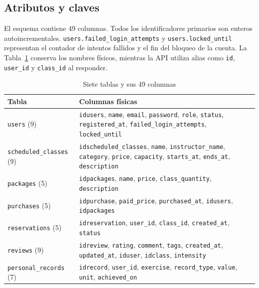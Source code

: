 \subsection{Atributos y claves}
El esquema contiene 49 columnas. Todos los identificadores primarios son enteros autoincrementales. \texttt{users.failed\_login\_attempts} y \texttt{users.locked\_until} representan el contador de intentos fallidos y el fin del bloqueo de la cuenta. La Tabla~\ref{tab:atributos-laura} conserva los nombres físicos, mientras la API utiliza alias como \texttt{id}, \texttt{user\_id} y \texttt{class\_id} al responder.
\begin{table}[!t]\caption{Siete tablas y sus 49 columnas}\label{tab:atributos-laura}\centering\footnotesize
\begin{tabular}{p{}p{}}\toprule
Tabla & Columnas físicas \\ \midrule
\texttt{users} (9) & \texttt{idusers}, \texttt{name}, \texttt{email}, \texttt{password}, \texttt{role}, \texttt{status}, \texttt{registered\_\allowbreak{}at}, \texttt{failed\_\allowbreak{}login\_\allowbreak{}attempts}, \texttt{locked\_\allowbreak{}until} \\
\texttt{scheduled\_\allowbreak{}classes} (9) & \texttt{idscheduled\_\allowbreak{}classes}, \texttt{name}, \texttt{instructor\_\allowbreak{}name}, \texttt{category}, \texttt{price}, \texttt{capacity}, \texttt{starts\_\allowbreak{}at}, \texttt{ends\_\allowbreak{}at}, \texttt{description} \\
\texttt{packages} (5) & \texttt{idpackages}, \texttt{name}, \texttt{price}, \texttt{class\_\allowbreak{}quantity}, \texttt{description} \\
\texttt{purchases} (5) & \texttt{idpurchase}, \texttt{paid\_\allowbreak{}price}, \texttt{purchased\_\allowbreak{}at}, \texttt{idusers}, \texttt{idpackages} \\
\texttt{reservations} (5) & \texttt{idreservation}, \texttt{user\_\allowbreak{}id}, \texttt{class\_\allowbreak{}id}, \texttt{created\_\allowbreak{}at}, \texttt{status} \\
\texttt{reviews} (9) & \texttt{idreview}, \texttt{rating}, \texttt{comment}, \texttt{tags}, \texttt{created\_\allowbreak{}at}, \texttt{updated\_\allowbreak{}at}, \texttt{iduser}, \texttt{idclass}, \texttt{intensity} \\
\texttt{personal\_\allowbreak{}records} (7) & \texttt{idrecord}, \texttt{user\_\allowbreak{}id}, \texttt{exercise}, \texttt{record\_\allowbreak{}type}, \texttt{value}, \texttt{unit}, \texttt{achieved\_\allowbreak{}on} \\
\bottomrule\end{tabular}\end{table}
